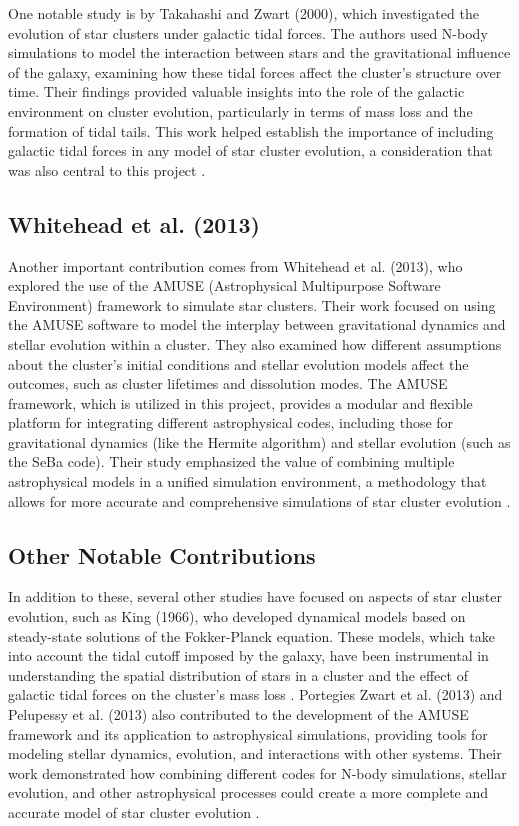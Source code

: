 \documentclass[10pt,twocolumn]{article}
\begin{document}
One notable study is by Takahashi and Zwart (2000), which investigated the evolution of star clusters under galactic tidal forces. The authors used N-body simulations to model the interaction between stars and the gravitational influence of the galaxy, examining how these tidal forces affect the cluster's structure over time. Their findings provided valuable insights into the role of the galactic environment on cluster evolution, particularly in terms of mass loss and the formation of tidal tails. This work helped establish the importance of including galactic tidal forces in any model of star cluster evolution, a consideration that was also central to this project \cite{Takahashi2000}.

\subsection{Whitehead et al. (2013)}
Another important contribution comes from Whitehead et al. (2013), who explored the use of the AMUSE (Astrophysical Multipurpose Software Environment) framework to simulate star clusters. Their work focused on using the AMUSE software to model the interplay between gravitational dynamics and stellar evolution within a cluster. They also examined how different assumptions about the cluster’s initial conditions and stellar evolution models affect the outcomes, such as cluster lifetimes and dissolution modes. The AMUSE framework, which is utilized in this project, provides a modular and flexible platform for integrating different astrophysical codes, including those for gravitational dynamics (like the Hermite algorithm) and stellar evolution (such as the SeBa code). Their study emphasized the value of combining multiple astrophysical models in a unified simulation environment, a methodology that allows for more accurate and comprehensive simulations of star cluster evolution \cite{whitehead2013amuse}.

\subsection{Other Notable Contributions}
In addition to these, several other studies have focused on aspects of star cluster evolution, such as King (1966), who developed dynamical models based on steady-state solutions of the Fokker-Planck equation. These models, which take into account the tidal cutoff imposed by the galaxy, have been instrumental in understanding the spatial distribution of stars in a cluster and the effect of galactic tidal forces on the cluster’s mass loss \cite{king1966}. Portegies Zwart et al. (2013) and Pelupessy et al. (2013) also contributed to the development of the AMUSE framework and its application to astrophysical simulations, providing tools for modeling stellar dynamics, evolution, and interactions with other systems. Their work demonstrated how combining different codes for N-body simulations, stellar evolution, and other astrophysical processes could create a more complete and accurate model of star cluster evolution \cite{portegies2013multiphysics,pelupessy2013amuse}.
\end{document}
